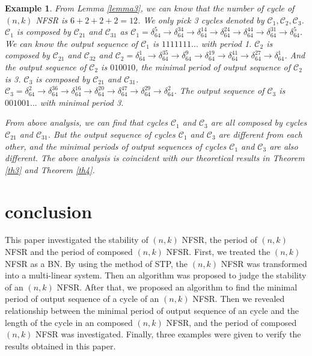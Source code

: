 \documentclass[conference]{IEEEtran}
\newtheorem{example}{Example}
\begin{document}
\begin{example}
From Lemma \ref{lemma3}, we can know that the number of cycle of $(n,k)$ NFSR is $6+2+2+2=12$. We only pick 3 cycles denoted by $\mathcal{C}_1,\mathcal{C}_2,\mathcal{C}_3$.
$\mathcal{C}_1$ is composed by $\mathcal{C}_{21}$ and $\mathcal{C}_{31}$ as $\mathcal{C}_1=\delta^5_{64}\rightarrow\delta^{34}_{64}\rightarrow\delta^{14}_{64}\rightarrow\delta^{24}_{64}\rightarrow\delta^{44}_{64}\rightarrow\delta^{31}_{64}\rightarrow\delta^5_{64}$.
We can know the output sequence of $\mathcal{C}_1$ is $1111111...$ with period 1. $\mathcal{C}_2$ is composed by $\mathcal{C}_{21}$ and $\mathcal{C}_{32}$ and $\mathcal{C}_2=\delta^1_{64}\rightarrow\delta^{35}_{64}\rightarrow\delta^{9}_{64}\rightarrow\delta^{19}_{64}\rightarrow\delta^{41}_{64}\rightarrow\delta^{27}_{64}\rightarrow\delta^1_{64}$.
 And the output sequence of $\mathcal{C}_2$ is $010010$, the minimal period of output sequence of $\mathcal{C}_2$ is 3. $\mathcal{C}_3$ is composed by $\mathcal{C}_{21}$ and $\mathcal{C}_{31}$.
$\mathcal{C}_3=\delta^2_{64}\rightarrow\delta^{36}_{64}\rightarrow\delta^{16}_{64}\rightarrow\delta^{20}_{64}\rightarrow\delta^{47}_{64}\rightarrow\delta^{29}_{64}\rightarrow\delta^2_{64} $. The output sequence of $\mathcal{C}_3$ is $001001...$ with minimal period 3.

From above analysis, we can find that cycles $\mathcal{C}_1$ and $\mathcal{C}_3$ are all composed by cycles $\mathcal{C}_{21}$ and $\mathcal{C}_{31}$.
But the output sequence of cycles $\mathcal{C}_1$ and $\mathcal{C}_3$ are different from each other, and the minimal periods of output sequences of cycles $\mathcal{C}_1$ and $\mathcal{C}_3$ are also different.
 The above analysis is coincident with our theoretical results in Theorem {\ref{th3}} and Theorem {\ref{th4}}.

\end{example}


\section{conclusion}
This paper investigated the stability of $(n,k)$ NFSR, the period of $(n,k)$ NFSR and the period of composed $(n,k)$ NFSR. First, we treated the $(n,k)$ NFSR as a BN. By using the method of STP, the $(n,k)$ NFSR was transformed into a multi-linear system. Then an algorithm was proposed to judge the stability of an $(n,k)$ NFSR. After that, we proposed an algorithm to find the minimal period of output sequence of a cycle of an $(n,k)$ NFSR. Then we revealed relationship between the minimal period of output sequence of an cycle and the length of the cycle in an composed $(n,k)$ NFSR, and the period of composed $(n,k)$ NFSR was investigated. Finally, three examples were given to verify the results obtained in this paper.
\end{document}
